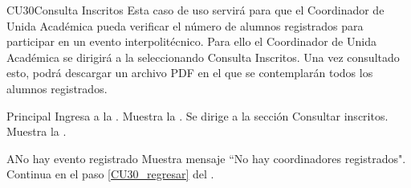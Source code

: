 \begin{UseCase}{CU30}{Consulta Inscritos}{
		\noindent Esta caso de uso servirá para que el Coordinador de Unida Académica pueda verificar el número de alumnos registrados para participar en un evento interpolitécnico.
		Para ello el Coordinador de Unida Académica se dirigirá a la  seleccionando Consulta Inscritos. Una vez consultado esto, podrá descargar un archivo PDF en el que se contemplarán todos los alumnos registrados.
	} \label{CU30_evento}

		\end{UseCase}
	
    \begin{UCtrayectoria}{Principal}
    \UCpaso[\UCactor] Ingresa a la .
    \UCpaso Muestra la . \label{CU30_regresar}
    \UCpaso[\UCactor] Se dirige a la sección Consultar inscritos.  
    \UCpaso Muestra la . 
    \end{UCtrayectoria}
    
    \begin{UCtrayectoriaA}{A}{No hay evento registrado}
    	\UCpaso Muestra mensaje “No hay coordinadores registrados".
    	\UCpaso Continua en el paso \ref{CU30_regresar} del .
    \end{UCtrayectoriaA}


	


